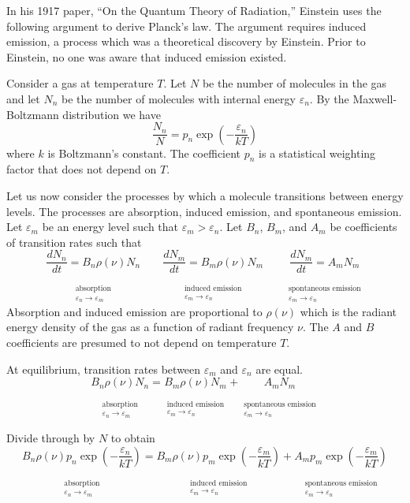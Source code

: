 \documentclass[12pt]{article}
\newcommand\BNM{B_n} %
\newcommand\BMN{B_m} %
\newcommand\AMN{A_m} %
\newcommand\ABSORPTION{\substack{\phantom{0}\\ \text{absorption}\\ \varepsilon_n\rightarrow\varepsilon_m}}
\newcommand\INDUCED{\substack{\phantom{0}\\ \text{induced emission}\\ \varepsilon_m\rightarrow\varepsilon_n}}
\newcommand\SPONTANEOUS{\substack{\phantom{0}\\ \text{spontaneous emission}\\ \varepsilon_m\rightarrow\varepsilon_n}}
\begin{document}
\noindent
In his 1917 paper, ``On the Quantum Theory of Radiation,''
Einstein uses the following argument to derive Planck's law.
The argument requires induced emission, a process which was a theoretical discovery by Einstein.
Prior to Einstein, no one was aware that induced emission existed.

\bigskip
\noindent
Consider a gas at temperature $T$.
Let $N$ be the number of molecules in the gas
and let $N_n$ be the number of molecules with internal energy $\varepsilon_n$.
By the Maxwell-Boltzmann distribution we have
\begin{equation*}
\frac{N_n}{N}=p_n\exp\left(-\frac{\varepsilon_n}{kT}\right)
\end{equation*}
where $k$ is Boltzmann's constant.
The coefficient $p_n$ is a statistical weighting factor that does not depend on $T$.

\bigskip
\noindent
Let us now consider the processes by which a molecule transitions between energy levels.
The processes are absorption, induced emission, and spontaneous emission.
Let $\varepsilon_m$ be an energy level such that $\varepsilon_m>\varepsilon_n$.
Let $\BNM$, $\BMN$, and $\AMN$ be coefficients of transition rates such that
\begin{equation*}
\underset{\ABSORPTION}{\frac{dN_n}{dt}=\BNM\rho(\nu)N_n}
\qquad
\underset{\INDUCED}{\frac{dN_m}{dt}=\BMN\rho(\nu)N_m}
\qquad
\underset{\SPONTANEOUS}{\frac{dN_m}{dt}=\AMN N_m}
\end{equation*}
Absorption and induced emission are proportional to $\rho(\nu)$
which is the radiant energy density of the gas
as a function of radiant frequency $\nu$.
The $A$ and $B$ coefficients are presumed to not depend on temperature $T$.

\bigskip
\noindent
At equilibrium, transition rates between $\varepsilon_m$ and $\varepsilon_n$ are equal.
\begin{equation*}
\underset{\ABSORPTION}{\BNM\rho(\nu)N_n}
=\underset{\INDUCED}{\BMN\rho(\nu)N_m}
+\underset{\SPONTANEOUS}{\AMN N_m}
\end{equation*}

\noindent
Divide through by $N$ to obtain
\begin{equation*}
\underset{\ABSORPTION}{\BNM\rho(\nu)p_n\exp\left(-\frac{\varepsilon_n}{kT}\right)}
=\underset{\INDUCED}{\BMN\rho(\nu)p_m\exp\left(-\frac{\varepsilon_m}{kT}\right)}
+\underset{\SPONTANEOUS}{\AMN p_m\exp\left(-\frac{\varepsilon_m}{kT}\right)}
\end{equation*}
\end{document}
